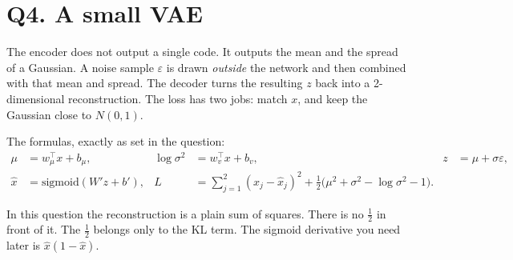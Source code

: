\documentclass[11pt,a4paper]{article}
\begin{document}
\section{Q4. A small VAE}

\begin{idea}
The encoder does not output a single code. It outputs the mean and the spread of a Gaussian. A noise sample \(\varepsilon\) is drawn \emph{outside} the network and then combined with that mean and spread. The decoder turns the resulting \(z\) back into a 2-dimensional reconstruction. The loss has two jobs: match \(x\), and keep the Gaussian close to \(N(0,1)\).
\end{idea}

\begin{center}
\end{center}

The formulas, exactly as set in the question:
\begin{align*}
\mu &= w_\mu^\top x + b_\mu, &
\log\sigma^2 &= w_v^\top x + b_v, &
z &= \mu+\sigma\varepsilon,\\
\hat x &= \mathrm{sigmoid}(W'z+b'), &
L &= \sum_{j=1}^{2}(x_j-\hat x_j)^2
   +\tfrac12\big(\mu^2+\sigma^2-\log\sigma^2-1\big).
\end{align*}

\begin{watch}
In this question the reconstruction is a plain sum of squares. There is no \(\tfrac12\) in front of it. The \(\tfrac12\) belongs only to the KL term. The sigmoid derivative you need later is \(\hat x(1-\hat x)\).
\end{watch}
\end{document}
